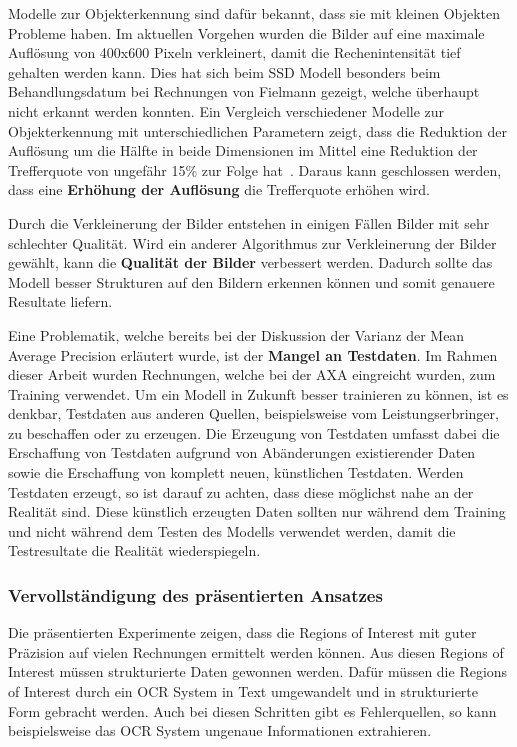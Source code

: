 Modelle zur Objekterkennung sind dafür bekannt, dass sie mit kleinen Objekten Probleme haben. Im aktuellen Vorgehen wurden die Bilder auf eine maximale Auflösung von 400x600 Pixeln verkleinert, damit die Rechenintensität tief gehalten werden kann. Dies hat sich beim SSD Modell besonders beim Behandlungsdatum bei Rechnungen von Fielmann gezeigt, welche überhaupt nicht erkannt werden konnten. Ein Vergleich verschiedener Modelle zur Objekterkennung mit unterschiedlichen Parametern zeigt, dass die Reduktion der Auflösung um die Hälfte in beide Dimensionen im Mittel eine Reduktion der Trefferquote von ungefähr 15\% zur Folge hat~\autocite{SSDFRCNN}. Daraus kann geschlossen werden, dass eine \textbf{Erhöhung der Auflösung} die Trefferquote erhöhen wird.

Durch die Verkleinerung der Bilder entstehen in einigen Fällen Bilder mit sehr schlechter Qualität. Wird ein anderer Algorithmus zur Verkleinerung der Bilder gewählt, kann die \textbf{Qualität der Bilder} verbessert werden. Dadurch sollte das Modell besser Strukturen auf den Bildern erkennen können und somit genauere Resultate liefern.

Eine Problematik, welche bereits bei der Diskussion der Varianz der Mean Average Precision erläutert wurde, ist der \textbf{Mangel an Testdaten}. Im Rahmen dieser Arbeit wurden Rechnungen, welche bei der AXA eingreicht wurden, zum Training verwendet. Um ein Modell in Zukunft besser trainieren zu können, ist es denkbar, Testdaten aus anderen Quellen, beispielsweise vom Leistungserbringer, zu beschaffen oder zu erzeugen. Die Erzeugung von Testdaten umfasst dabei die Erschaffung von Testdaten aufgrund von Abänderungen existierender Daten sowie die Erschaffung von komplett neuen, künstlichen Testdaten. Werden Testdaten erzeugt, so ist darauf zu achten, dass diese möglichst nahe an der Realität sind. Diese künstlich erzeugten Daten sollten nur während dem Training und nicht während dem Testen des Modells verwendet werden, damit die Testresultate die Realität wiederspiegeln.

\subsubsection{Vervollständigung des präsentierten Ansatzes}
\label{chap:ie-quality-check}

Die präsentierten Experimente zeigen, dass die Regions of Interest mit guter Präzision auf vielen Rechnungen ermittelt werden können. Aus diesen Regions of Interest müssen strukturierte Daten gewonnen werden. Dafür müssen die Regions of Interest durch ein OCR System in Text umgewandelt und in strukturierte Form gebracht werden. Auch bei diesen Schritten gibt es Fehlerquellen, so kann beispielsweise das OCR System ungenaue Informationen extrahieren.

